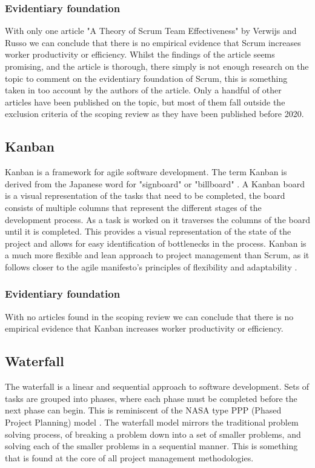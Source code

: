 \documentclass[12pt]{article}
\begin{document}
\subsubsection{Evidentiary foundation}
With only one article "A Theory of Scrum Team Effectiveness" by Verwijs and Russo \cite{verwijsTheoryScrumTeam2023} we can conclude that there
is no empirical evidence that Scrum increases worker productivity or efficiency. Whilst the findings of the article seems promising, and the article is thorough, 
there simply is not enough research on the topic to comment on the evidentiary foundation of Scrum, this is something taken in too account by the authors of 
the article. 
Only a handful of other articles have been published on the topic, but most of them fall outside the exclusion criteria of the scoping review as they
have been published before 2020.

\subsection{Kanban}
Kanban is a framework for agile software development. The term Kanban is derived from the Japanese word for "signboard" or "billboard" \cite{KanbanDevelopment2025}.
A Kanban board is a visual representation of the tasks that need to be completed, the board consists of multiple columns that represent the 
different stages of the development process. As a task is worked on it traverses the columns of the board until it is completed.
This provides a visual representation of the state of the project and allows for easy identification of bottlenecks in the process.
Kanban is a much more flexible and lean approach to project management than Scrum, as it follows closer to the agile manifesto's principles 
of flexibility and adaptability \cite{ManifestoAgileSoftware}.

\subsubsection{Evidentiary foundation}
With no articles found in the scoping review we can conclude that there is no empirical evidence that Kanban increases worker productivity or efficiency.

\subsection{Waterfall}
The waterfall \cite{WaterfallModel2025} is a linear and sequential approach to software development. Sets of tasks are grouped into phases, 
where each phase must be completed before the next phase can begin. This is reminiscent of the NASA type PPP 
(Phased Project Planning) model \cite{PhasedProjectPlanning1968}.
The waterfall model mirrors the traditional problem solving process, of breaking a problem down into a set of smaller problems,
and solving each of the smaller problems in a sequential manner. This is something that is found at the core 
of all project management methodologies.
\end{document}
